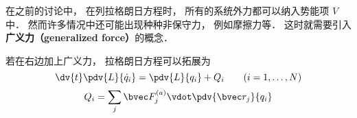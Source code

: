 

在之前的讨论中， 在列拉格朗日方程时， 所有的系统外力都可以纳入势能项 $V$ 中． 然而许多情况中还可能出现种种非保守力， 例如摩擦力等． 这时就需要引入\textbf{广义力（generalized force）}的概念．

若在右边加上广义力， 拉格朗日方程可以拓展为
\begin{equation}
\dv{t} \pdv{L}{\dot q_i} = \pdv{L}{q_i} + Q_i
\qquad (i=1,\dots,N)
\end{equation}
\begin{equation}
Q_i = \sum_j \bvec F_j^{(a)} \vdot \pdv{\bvec r_j}{q_i}
\end{equation}
